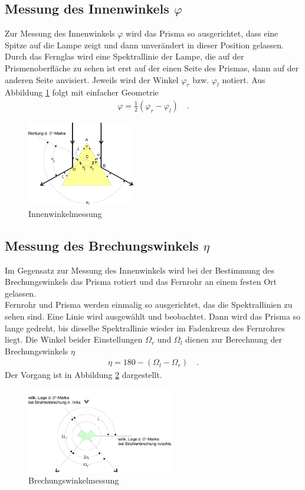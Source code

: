 \clearpage

\subsection{Messung des Innenwinkels $\varphi$}
Zur Messung des Innenwinkels $\varphi$ wird das Prisma so ausgerichtet, dass eine Spitze auf die Lampe zeigt und dann unverändert in dieser Position gelassen. Durch das Fernglas wird eine Spektrallinie der Lampe, die auf der Prismenoberfläche zu sehen ist erst auf der einen Seite des Prismas, dann auf der anderen Seite anvisiert. Jeweils wird der Winkel $\varphi_r$ bzw. $\varphi_l$ notiert. Aus Abbildung \ref{fig:prisma2} folgt mit einfacher Geometrie
\begin{align}\label{Phi}
	\varphi = \frac{1}{2} (\varphi_r - \varphi_l) \quad.
\end{align}

\begin{figure}[h!]
	\centering
	\includegraphics[width=0.42\textwidth]{Prisma2.png}
	\caption{Innenwinkelmessung\footnotemark}
	\label{fig:prisma2}
\end{figure}

\subsection{Messung des Brechungswinkels $\eta$}
Im Gegensatz zur Messung des Innenwinkels wird bei der Bestimmung des Brechungswinkels das Prisma rotiert und das Fernrohr an einem festen Ort gelassen. \\
Fernrohr und Prisma werden einmalig so ausgerichtet, das die Spektrallinien zu sehen sind. Eine Linie wird ausgewählt und beobachtet. Dann wird das Prisma so lange gedreht, bis dieselbe Spektrallinie wieder im Fadenkreuz des Fernrohres liegt. Die Winkel beider Einstellungen $\Omega_r$ und $\Omega_l$ dienen zur Berechnung der Brechungswinkels $\eta$
\begin{align}\label{Eta}
	\eta = 180 - (\Omega_l - \Omega_r) \quad .
\end{align}
Der Vorgang ist in Abbildung \ref{fig:prisma3} dargestellt.

\begin{figure}[h!]
	\centering
	\includegraphics[width=0.57\textwidth]{Prisma3.png}
	\caption{Brechungswinkelmessung \footnotemark}
	\label{fig:prisma3}
\end{figure}


